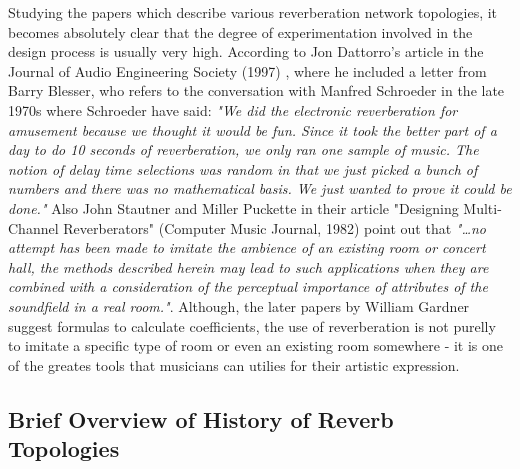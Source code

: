 \documentclass[12pt]{report}
\begin{document}
  Studying the papers which describe various reverberation network topologies,
  it becomes absolutely clear that the degree of experimentation involved in
  the design process is usually very high. According to Jon Dattorro's article
  in the Journal of Audio Engineering Society (1997) \cite{dattorro1997effect},
  where he included a letter from Barry Blesser, who refers to the conversation
  with Manfred Schroeder in the late 1970s where Schroeder have said: \emph{"We
  did the electronic reverberation for amusement because we thought it would be
  fun. Since it took the better part of a day to do 10 seconds of reverberation,
  we only ran one sample of music. The notion of delay time selections was random
  in that we just picked a bunch of numbers and there was no mathematical basis.
  We just wanted to prove it could be done."} Also John Stautner and Miller
  Puckette in their article "Designing Multi-Channel Reverberators" (Computer Music
  Journal, 1982) \cite{puckette1982reverb} point out that \emph{"\dots no attempt
  has been made to imitate the ambience of an existing room or concert hall,
  the methods described herein may lead to such applications when they are
  combined with a consideration of the perceptual importance of attributes of
  the soundfield in a real room."}. Although, the later papers by William Gardner
  \cite{gardner1992virtual, gardner1998algorithms} suggest formulas to calculate
  coefficients, the use of reverberation is not purelly to imitate a specific
  type of room or even an existing room somewhere - it is one of the greates tools
  that musicians can utilies for their artistic expression.



  \subsection{Brief Overview of History of Reverb Topologies}
\end{document}
